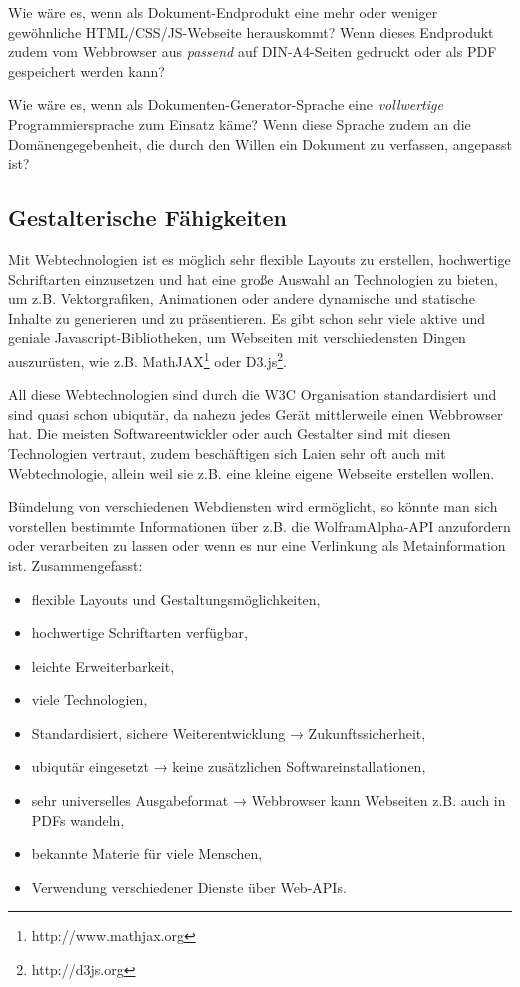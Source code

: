 Wie wäre es, wenn als Dokument-Endprodukt eine mehr oder weniger
gewöhnliche HTML/CSS/JS-Webseite herauskommt?
Wenn dieses Endprodukt zudem vom Webbrowser aus \emph{passend} auf
DIN-A4-Seiten gedruckt oder als PDF gespeichert werden kann?

Wie wäre es, wenn als Dokumenten-\-Generator-\-Sprache eine \emph{vollwertige}
Programmiersprache zum Einsatz käme? Wenn diese Sprache zudem an die
Domänen\-gege\-ben\-heit, die durch den Willen ein Dokument zu verfassen,
angepasst ist?

\subsection{Gestalterische Fähigkeiten}

Mit Webtechnologien ist es möglich sehr flexible Layouts zu erstellen,
hochwertige Schriftarten einzusetzen und hat eine große Auswahl an
Technologien zu bieten, um z.B. Vektorgrafiken, Animationen oder
andere dynamische und statische Inhalte zu generieren und zu
präsentieren. Es gibt schon sehr viele aktive und geniale Javascript-Bibliotheken,
um Webseiten mit verschiedensten Dingen auszurüsten,
wie z.B. MathJAX\footnote{http://www.mathjax.org} oder
D3.js\footnote{http://d3js.org}.

All diese Webtechnologien sind durch die W3C Organisation standardisiert
und sind quasi schon ubiqutär, da nahezu jedes Gerät mittlerweile einen
Webbrowser hat. Die meisten Softwareentwickler oder auch
Gestalter sind mit diesen Technologien vertraut, zudem beschäftigen sich
Laien sehr oft auch mit Webtechnologie, allein weil sie z.B. eine kleine
eigene Webseite erstellen wollen.

Bündelung von verschiedenen Webdiensten wird ermöglicht, so könnte man sich
vorstellen bestimmte Informationen über z.B. die WolframAlpha-API
anzufordern oder verarbeiten zu lassen oder wenn es nur eine Verlinkung
als Metainformation ist. Zusammengefasst:

\begin{itemize}
  \item flexible Layouts und Gestaltungsmöglichkeiten,
  \item hochwertige Schriftarten verfügbar,
  \item leichte Erweiterbarkeit,
  \item viele Technologien,
  \item Standardisiert, sichere Weiterentwicklung → Zukunftssicherheit,
  \item ubiqutär eingesetzt → keine zusätzlichen Softwareinstallationen,
  \item sehr universelles Ausgabeformat → Webbrowser
        kann Webseiten z.B. auch in PDFs wandeln,
  \item bekannte Materie für viele Menschen,
  \item Verwendung verschiedener Dienste über Web-APIs.
\end{itemize}

